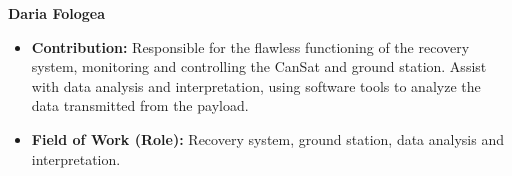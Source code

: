 \item[] \textbf{Daria Fologea}
    \begin{itemize}[label=]
        \item[\faEdit] \textbf{Contribution:} Responsible for the flawless functioning of the recovery system, monitoring and controlling the CanSat and ground station. Assist with data analysis and interpretation, using software tools to analyze the data transmitted from the payload.
        \item[\faMicroscope] \textbf{Field of Work (Role):} Recovery system, ground station, data analysis and interpretation.
    \end{itemize}
    \vspace{0.2 cm}
    